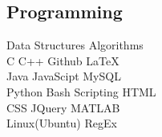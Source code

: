 \documentclass[]{deedy-resume-openfont}
\begin{document}
\begin{minipage}[t]{0.33\textwidth}
\subsection{Programming}
\textbullet{}Data Structures  \textbullet{}Algorithms \\ \textbullet{}C  \textbullet{}C++ \textbullet{}Github \textbullet{}\LaTeX  \\
\textbullet{}Java \textbullet{}JavaScipt \textbullet{} MySQL \\
\textbullet{}Python  \textbullet{}Bash Scripting \textbullet{}HTML \\
\textbullet{}CSS \textbullet{}JQuery \textbullet{}MATLAB  \\
\textbullet{}Linux(Ubuntu)     \textbullet{}RegEx \\
\sectionsep

%
%

\end{minipage} 
\hfill
\end{document}
